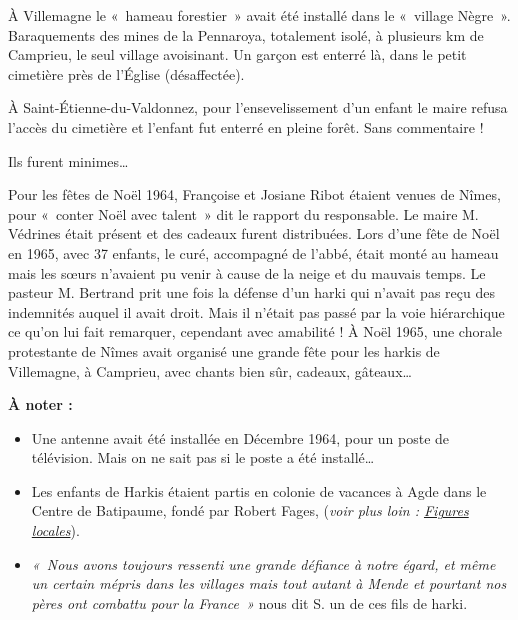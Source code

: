 À Villemagne le «~hameau forestier~» avait été installé dans le «~village
Nègre~». Baraquements des mines de la Pennaroya, totalement isolé, à plusieurs km de
Camprieu, le seul village avoisinant. Un garçon est enterré là, dans le petit cimetière
près de l’Église (désaffectée).

À Saint-Étienne-du-Valdonnez, pour l’ensevelissement d’un enfant le maire refusa
l’accès du cimetière et l’enfant fut enterré en pleine forêt.
Sans commentaire !


Ils furent minimes…

Pour les fêtes de Noël 1964, Françoise et Josiane Ribot étaient venues de Nîmes, pour
«~conter Noël avec talent~» dit le rapport du responsable. Le maire M. Védrines était
présent et des cadeaux furent distribuées.
Lors d’une fête de Noël en 1965, avec 37 enfants, le curé, accompagné de l’abbé,
était monté au hameau mais les sœurs n’avaient pu venir à cause de la neige et du
mauvais temps.
Le pasteur M. Bertrand prit une fois la défense d’un harki qui n’avait pas reçu des
indemnités auquel il avait droit. Mais il n’était pas passé par la voie hiérarchique ce
qu’on lui fait remarquer, cependant avec amabilité !
À Noël 1965, une chorale protestante de Nîmes avait organisé une grande fête pour
les harkis de Villemagne, à Camprieu, avec chants bien sûr, cadeaux, gâteaux…

\textbf{À noter :}

\begin{itemize}
    \item Une antenne avait été installée en Décembre 1964, pour un poste de télévision.
    Mais on ne sait pas si le poste a été installé…
    
    \item Les enfants de Harkis étaient partis en colonie de vacances à Agde dans le
    Centre de Batipaume, fondé par Robert Fages, (\textit{voir plus loin : \hyperref[figuresLocales]{Figures locales}}).
    
    \item \textit{«~Nous avons toujours ressenti une grande défiance à notre égard, et même un certain mépris
    dans les villages mais tout autant à Mende et pourtant nos pères ont combattu pour la
    France~»} nous dit S. un de ces fils de harki.
\end{itemize}
